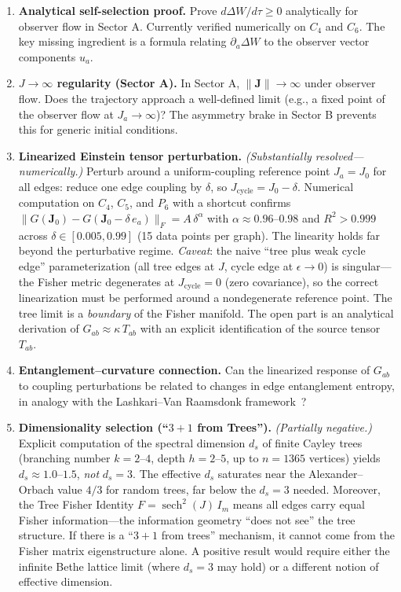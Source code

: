 \documentclass[11pt]{article}
\theoremstyle{definition}
\theoremstyle{remark}
\newcommand{\Fish}{F}
\newcommand{\obs}{u}
\newcommand{\coupl}{\mathbf{J}}
\newcommand{\Ein}{G}
\begin{document}
\begin{enumerate}
\item \textbf{Analytical self-selection proof.} Prove
  $d\Delta W/d\tau \geq 0$ analytically for observer flow in Sector A.
  Currently verified numerically on $C_4$ and $C_6$. The key missing
  ingredient is a formula relating $\partial_a \Delta W$ to the observer
  vector components $\obs_a$.

\item \textbf{$J \to \infty$ regularity (Sector A).} In Sector A,
  $\|\coupl\| \to \infty$ under observer flow. Does the trajectory
  approach a well-defined limit (e.g., a fixed point of the observer
  flow at $J_a \to \infty$)? The asymmetry brake in Sector B prevents
  this for generic initial conditions.

\item \textbf{Linearized Einstein tensor perturbation.} \emph{(Substantially
  resolved---numerically.)} Perturb around a uniform-coupling reference
  point $J_a = J_0$ for all edges: reduce one edge coupling by
  $\delta$, so $J_{\mathrm{cycle}} = J_0 - \delta$. Numerical computation
  on $C_4$, $C_5$, and $P_6$ with a shortcut confirms
  $\|\Ein(\coupl_0) - \Ein(\coupl_0 - \delta\, e_a)\|_F = A\,\delta^\alpha$
  with $\alpha \approx 0.96$--$0.98$ and $R^2 > 0.999$ across
  $\delta \in [0.005, 0.99]$ (15 data points per graph).
  The linearity holds far beyond the perturbative regime.
  \emph{Caveat}: the naive ``tree plus weak cycle edge'' parameterization
  (all tree edges at $J$, cycle edge at $\epsilon \to 0$) is singular---the
  Fisher metric degenerates at $J_{\mathrm{cycle}} = 0$ (zero covariance),
  so the correct linearization must be performed around a nondegenerate
  reference point. The tree limit is a \emph{boundary} of the Fisher
  manifold. The open part is an analytical derivation of $\Ein_{ab}
  \approx \kappa\, T_{ab}$ with an explicit identification of the
  source tensor $T_{ab}$.

\item \textbf{Entanglement--curvature connection.}
  Can the linearized response of $\Ein_{ab}$ to coupling perturbations
  be related to changes in edge entanglement entropy, in analogy with
  the Lashkari--Van Raamsdonk framework~\cite{Lashkari2014}?

\item \textbf{Dimensionality selection (``$3{+}1$ from Trees'').}
  \emph{(Partially negative.)} Explicit computation of the spectral
  dimension $d_s$ of finite Cayley trees (branching number $k = 2$--$4$,
  depth $h = 2$--$5$, up to $n = 1365$ vertices) yields $d_s \approx
  1.0$--$1.5$, \emph{not} $d_s = 3$. The effective $d_s$ saturates near
  the Alexander--Orbach value $4/3$ for random trees, far below the
  $d_s = 3$ needed. Moreover, the Tree Fisher Identity
  $\Fish = \operatorname{sech}^2(J)\, I_m$ means all edges carry equal
  Fisher information---the information geometry ``does not see'' the tree
  structure. If there is a ``$3{+}1$ from trees'' mechanism, it cannot
  come from the Fisher matrix eigenstructure alone. A positive result
  would require either the infinite Bethe lattice limit (where $d_s = 3$
  may hold) or a different notion of effective dimension.


\end{enumerate}
\end{document}
